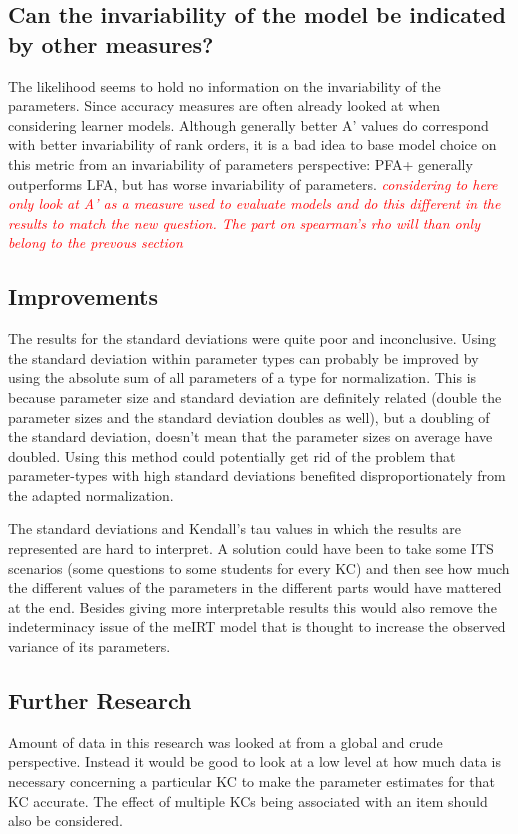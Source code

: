 \documentclass{scrartcl}
\newcommand\todo[1]{\textit{\textcolor{red}{#1}}}
\begin{document}
\subsection{Can the invariability of the model be indicated by other measures?}
The likelihood seems to hold no information on the invariability of the parameters. Since accuracy measures are often already looked at when considering learner models. Although generally better A' values do correspond with better invariability of rank orders, it is a bad idea to base model choice on this metric from an invariability of parameters perspective: PFA+ generally outperforms LFA, but has worse invariability of parameters.
\todo{considering to here only look at A' as a measure used to evaluate models and do this different in the results to match the new question. The part on spearman's rho will than only belong to the prevous section}  

\subsection{Improvements}
The results for the standard deviations were quite poor and inconclusive. Using the standard deviation within parameter types can probably be improved by using the absolute sum of all parameters of a type for normalization. This is because parameter size and standard deviation are definitely related (double the parameter sizes and the standard deviation doubles as well), but a doubling of the standard deviation, doesn't mean that the parameter sizes on average have doubled. Using this method could potentially get rid of the problem that parameter-types with high standard deviations benefited disproportionately from the adapted normalization.

The standard deviations and Kendall's tau values in which the results are represented are hard to interpret. A solution could have been to take some ITS scenarios (some questions to some students for every KC) and then see how much the different values of the parameters in the different parts would have mattered at the end. Besides giving more interpretable results this would also remove the indeterminacy issue of the meIRT model that is thought to increase the observed variance of its parameters.



\subsection{Further Research}
Amount of data in this research was looked at from a global and crude perspective. Instead it would be good to look at a low level at how much data is necessary concerning a particular KC to make the parameter estimates for that KC accurate. The effect of multiple KCs being associated with an item should also be considered.
\end{document}
